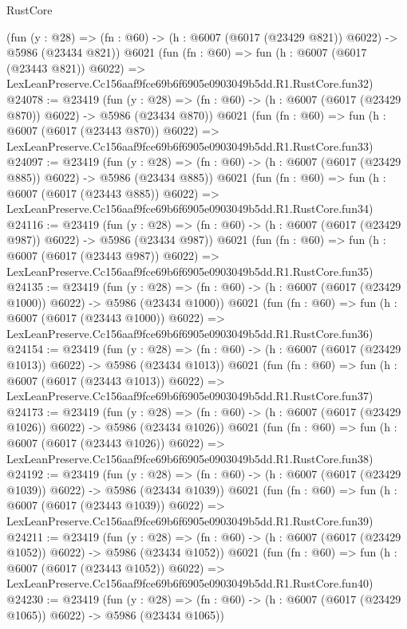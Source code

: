 \begin{lexlean}{RustCore}
\begin{coremodule}
    (fun (y : @28) => (fn : @60) -> (h : @6007 (@6017 (@23429 @821)) @6022) -> @5986 (@23434 @821))
    @6021
    (fun (fn : @60) =>
    fun (h : @6007 (@6017 (@23443 @821)) @6022) =>
    LexLeanPreserve.Cc156aaf9fce69b6f6905e0903049b5dd.R1.RustCore.fun32)
@24078 := @23419
    (fun (y : @28) => (fn : @60) -> (h : @6007 (@6017 (@23429 @870)) @6022) -> @5986 (@23434 @870))
    @6021
    (fun (fn : @60) =>
    fun (h : @6007 (@6017 (@23443 @870)) @6022) =>
    LexLeanPreserve.Cc156aaf9fce69b6f6905e0903049b5dd.R1.RustCore.fun33)
@24097 := @23419
    (fun (y : @28) => (fn : @60) -> (h : @6007 (@6017 (@23429 @885)) @6022) -> @5986 (@23434 @885))
    @6021
    (fun (fn : @60) =>
    fun (h : @6007 (@6017 (@23443 @885)) @6022) =>
    LexLeanPreserve.Cc156aaf9fce69b6f6905e0903049b5dd.R1.RustCore.fun34)
@24116 := @23419
    (fun (y : @28) => (fn : @60) -> (h : @6007 (@6017 (@23429 @987)) @6022) -> @5986 (@23434 @987))
    @6021
    (fun (fn : @60) =>
    fun (h : @6007 (@6017 (@23443 @987)) @6022) =>
    LexLeanPreserve.Cc156aaf9fce69b6f6905e0903049b5dd.R1.RustCore.fun35)
@24135 := @23419
    (fun (y : @28) =>
    (fn : @60) -> (h : @6007 (@6017 (@23429 @1000)) @6022) -> @5986 (@23434 @1000))
    @6021
    (fun (fn : @60) =>
    fun (h : @6007 (@6017 (@23443 @1000)) @6022) =>
    LexLeanPreserve.Cc156aaf9fce69b6f6905e0903049b5dd.R1.RustCore.fun36)
@24154 := @23419
    (fun (y : @28) =>
    (fn : @60) -> (h : @6007 (@6017 (@23429 @1013)) @6022) -> @5986 (@23434 @1013))
    @6021
    (fun (fn : @60) =>
    fun (h : @6007 (@6017 (@23443 @1013)) @6022) =>
    LexLeanPreserve.Cc156aaf9fce69b6f6905e0903049b5dd.R1.RustCore.fun37)
@24173 := @23419
    (fun (y : @28) =>
    (fn : @60) -> (h : @6007 (@6017 (@23429 @1026)) @6022) -> @5986 (@23434 @1026))
    @6021
    (fun (fn : @60) =>
    fun (h : @6007 (@6017 (@23443 @1026)) @6022) =>
    LexLeanPreserve.Cc156aaf9fce69b6f6905e0903049b5dd.R1.RustCore.fun38)
@24192 := @23419
    (fun (y : @28) =>
    (fn : @60) -> (h : @6007 (@6017 (@23429 @1039)) @6022) -> @5986 (@23434 @1039))
    @6021
    (fun (fn : @60) =>
    fun (h : @6007 (@6017 (@23443 @1039)) @6022) =>
    LexLeanPreserve.Cc156aaf9fce69b6f6905e0903049b5dd.R1.RustCore.fun39)
@24211 := @23419
    (fun (y : @28) =>
    (fn : @60) -> (h : @6007 (@6017 (@23429 @1052)) @6022) -> @5986 (@23434 @1052))
    @6021
    (fun (fn : @60) =>
    fun (h : @6007 (@6017 (@23443 @1052)) @6022) =>
    LexLeanPreserve.Cc156aaf9fce69b6f6905e0903049b5dd.R1.RustCore.fun40)
@24230 := @23419
    (fun (y : @28) =>
    (fn : @60) -> (h : @6007 (@6017 (@23429 @1065)) @6022) -> @5986 (@23434 @1065))

\end{coremodule}
\end{lexlean}
